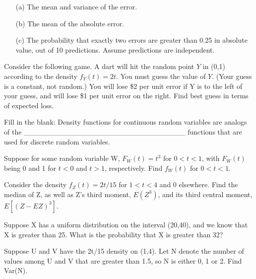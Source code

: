 \begin{itemize}

\item [(a)] The mean and variance of the error. 

\item [(b)] The mean of the absolute error.

\item [(c)] The probability that exactly two errors are greater than 0.25 in
absolute value, out of 10 predictions. Assume predictions are
independent. 

\end{itemize}

\oneproblem Consider the following game. A dart will hit the random
point $Y$ in (0,1) according to the density $f_Y(t) = 2t$. You must
guess the value of $Y$.  (Your guess is a constant, not random.) You
will lose \$2 per unit error if Y is to the left of your guess, and will
lose \$1 per unit error on the right. Find best guess in terms of
expected loss.

\oneproblem
Fill in the blank:  Density functions for continuous random
variables are analogs of the
\_\_\_\_\_\_\_\_\_\_\_\_\_\_\_\_\_\_\_\_\_\_\_\_\_\_\_\_\_\_\_
functions that are used for discrete random variables.

\oneproblem
Suppose for some random variable W, $F_W(t) = t^3$ for $0 <
t < 1$, with $F_W(t)$ being 0 and 1 for $t < 0$ and $t > 1$, respectively.
Find $f_W(t)$ for $0 < t < 1$.

\oneproblem
Consider the density $f_Z(t) = 2t/15$ for $1 < t < 4$ and 0 elsewhere.
Find the median of Z, as well as Z's third moment, $E(Z^3)$, and its
third central moment, $E[(Z-EZ)^3]$.

\oneproblem
Suppose X has a uniform distribution on the interval
(20,40), and we know that X is greater than 25.  What is the probability
that X is greater than 32?

\oneproblem
Suppose U and V have the 2t/15 density on (1,4).  Let N
denote the number of values among U and V that are greater than 1.5,
so N is either 0, 1 or 2.  Find Var(N).

